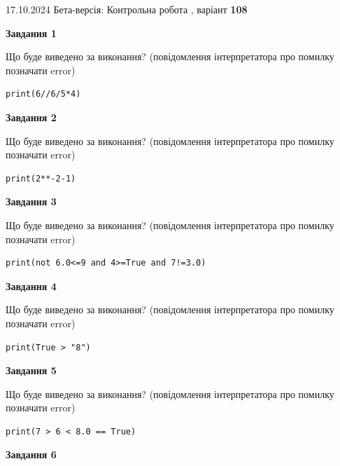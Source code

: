 \documentclass[12pt, ukrainian]{article}
\begin{document}
{\Large{17.10.2024 Бета-версія: Контрольна робота , варіант  \No \textbf { 108 }\par}}
{
\begin {large}
{\begin {center}\textbf{Завдання 1}\end {center}}

Що буде виведено за виконання? (повідомлення інтерпретатора про помилку позначати error)\par
\begin{verbatim}
print(6//6/5*4)
\end{verbatim}

{\begin {center}\textbf{Завдання 2}\end {center}}

Що буде виведено за виконання? (повідомлення інтерпретатора про помилку позначати error)\par
\begin{verbatim}
print(2**-2-1)
\end{verbatim}

{\begin {center}\textbf{Завдання 3}\end {center}}

Що буде виведено за виконання? (повідомлення інтерпретатора про помилку позначати error)\par
\begin{verbatim}
print(not 6.0<=9 and 4>=True and 7!=3.0)
\end{verbatim}

{\begin {center}\textbf{Завдання 4}\end {center}}

Що буде виведено за виконання? (повідомлення інтерпретатора про помилку позначати error)\par
\begin{verbatim}
print(True > "8")
\end{verbatim}

{\begin {center}\textbf{Завдання 5}\end {center}}

Що буде виведено за виконання? (повідомлення інтерпретатора про помилку позначати error)\par
\begin{verbatim}
print(7 > 6 < 8.0 == True)
\end{verbatim}

{\begin {center}\textbf{Завдання 6}\end {center}}


\end{large}}
\end{document}
